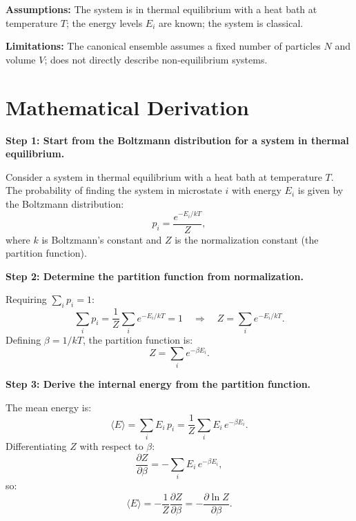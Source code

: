 \textbf{Assumptions:} The system is in thermal equilibrium with a heat bath at temperature $T$; the energy levels $E_{i}$ are known; the system is classical.


\textbf{Limitations:} The canonical ensemble assumes a fixed number of particles $N$ and volume $V$; does not directly describe non-equilibrium systems.


\section*{Mathematical Derivation}

\textbf{Step 1: Start from the Boltzmann distribution for a system in thermal equilibrium.}

Consider a system in thermal equilibrium with a heat bath at temperature $T$. The probability of finding the system in microstate $i$ with energy $E_i$ is given by the Boltzmann distribution:
\begin{equation}
p_i = \frac{e^{-E_i/kT}}{Z},
\end{equation}
where $k$ is Boltzmann's constant and $Z$ is the normalization constant (the partition function).

\textbf{Step 2: Determine the partition function from normalization.}

Requiring $\sum_i p_i = 1$:
\begin{equation}
\sum_i p_i = \frac{1}{Z}\sum_i e^{-E_i/kT} = 1 \quad\Longrightarrow\quad Z = \sum_i e^{-E_i/kT}.
\end{equation}
Defining $\beta = 1/kT$, the partition function is:
\begin{equation}
\boxed{Z = \sum_i e^{-\beta E_i}.}
\end{equation}

\textbf{Step 3: Derive the internal energy from the partition function.}

The mean energy is:
\begin{equation}
\langle E \rangle = \sum_i E_i\,p_i = \frac{1}{Z}\sum_i E_i\,e^{-\beta E_i}.
\end{equation}
Differentiating $Z$ with respect to $\beta$:
\begin{equation}
\frac{\partial Z}{\partial \beta} = -\sum_i E_i\,e^{-\beta E_i},
\end{equation}
so:
\begin{equation}
\langle E \rangle = -\frac{1}{Z}\frac{\partial Z}{\partial \beta} = -\frac{\partial \ln Z}{\partial \beta}.
\end{equation}

